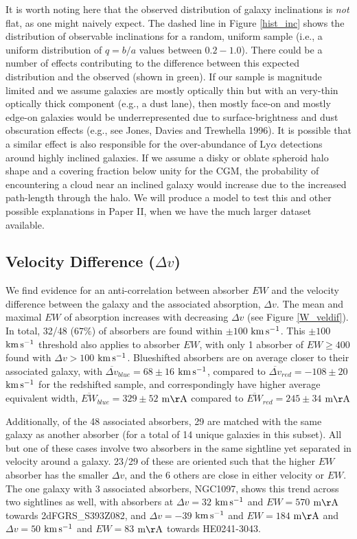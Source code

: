 \documentclass[twocolumn,tighten]{aastex6}
\begin{document}
It is worth noting here that the observed distribution of galaxy inclinations is \emph{not} flat, as one might naively expect. The dashed line in Figure \ref{hist_inc} shows the distribution of observable inclinations for a random, uniform sample (i.e., a uniform distribution of $q=b/a$ values between $0.2 - 1.0$). There could be a number of effects contributing to the difference between this expected distribution and the observed (shown in green). If our sample is magnitude limited and we assume galaxies are mostly optically thin but with an very-thin optically thick component (e.g., a dust lane), then mostly face-on and mostly edge-on galaxies would be underrepresented due to surface-brightness and dust obscuration effects (e.g., see Jones, Davies and Trewhella 1996). It is possible that a similar effect is also responsible for the over-abundance of Ly$\alpha$ detections around highly inclined galaxies. If we assume a disky or oblate spheroid halo shape and a covering fraction below unity for the CGM, the probability of encountering a cloud near an inclined galaxy would increase due to the increased path-length through the halo. We will produce a model to test this and other possible explanations in Paper II, when we have the much larger dataset available.


\subsection{Velocity Difference \rm($\Delta v$\rm)}
\label{veldiff}

We find evidence for an anti-correlation between absorber $EW$ and the velocity difference between the galaxy and the associated absorption, $\Delta v$. The mean and maximal $EW$ of absorption increases with decreasing $\Delta v$ (see Figure \ref{W_veldif}). In total, 32/48 ($67\%$) of absorbers are found within $\pm100$ $\rm km\, s^{-1}$. This $\pm100$ $\rm km\, s^{-1}$ threshold also applies to absorber $EW$, with only 1 absorber of $EW \geq 400$ found with $\Delta v > 100$ $\rm km\, s^{-1}$. Blueshifted absorbers are on average closer to their associated galaxy, with $\overline{\Delta v}_{blue} = 68\pm16$ $\rm km\, s^{-1}$, compared to $\overline{\Delta v}_{red}=-108\pm20$ $\rm km\, s^{-1}$ for the redshifted sample, and correspondingly have higher average equivalent width, $\overline{EW}_{blue}=329\pm52$ $\rm m\AA$ compared to $\overline{EW}_{red}=245\pm34$ $\rm m\AA$

Additionally, of the 48 associated absorbers, 29 are matched with the same galaxy as another absorber (for a total of 14 unique galaxies in this subset). All but one of these cases involve two absorbers in the same sightline yet separated in velocity around a galaxy. 23/29 of these are oriented such that the higher $EW$ absorber has the smaller $\Delta v$, and the 6 others are close in either velocity or $EW$. The one galaxy with 3 associated absorbers, NGC1097, shows this trend across two sightlines as well, with absorbers at $\Delta v = 32$ $\rm km\, s^{-1}$ and $EW = 570$ $\rm m\AA$ towards 2dFGRS\_S393Z082, and $\Delta v = -39$ $\rm km\, s^{-1}$ and $EW = 184$ $\rm m\AA$ and $\Delta v = 50$ $\rm km\, s^{-1}$ and $EW = 83$ $\rm m\AA$ towards HE0241-3043.
\end{document}

